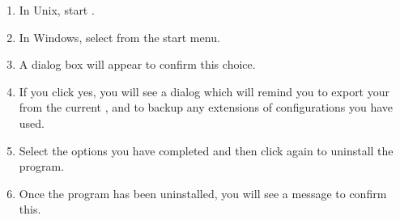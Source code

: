 
\begin{enumerate}

\item In Unix, start .  
\item In Windows, select  from the  start menu. 

 
\item A dialog box will appear to confirm this choice. 
\item If you click yes, you will see a dialog which will remind you to export your \gdprojects{} from the current \gddb{}, and to backup any extensions of configurations you have used.
\item Select the options you have completed and then click   again to uninstall the program. 
\item Once the program has been uninstalled, you will see a  message to confirm this.  
\end{enumerate}

